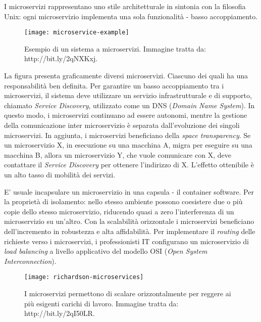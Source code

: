 I microservizi rappresentano uno stile architetturale in sintonia con la 
filosofia Unix: ogni microservizio implementa una sola funzionalità - basso 
accoppiamento.

\begin{figure}[htbp]
	\begin{center}
		\texttt{[image: microservice-example]}
		\caption{Esempio di un sistema a microservizi. Immagine tratta 
da: http://bit.ly/2qNXKxj.}
	\end{center}
\end{figure}

La figura presenta graficamente diversi microservizi. Ciascuno dei quali ha una 
responsabilità ben definita. Per garantire un basso accoppiamento tra i 
microservizi, il sistema deve utilizzare un servizio infrastrutturale e di 
supporto, chiamato \textit{Service Discovery}, utilizzato come un DNS 
(\textit{Domain Name System}). In questo modo, i microservizi continuano ad 
essere autonomi, mentre la gestione della comunicazione inter microservizio è 
separata dall'evoluzione dei singoli microservizi. 
In aggiunta, i microservizi beneficiano della \textit{space transparency}. Se 
un microservizio X, in esecuzione su una macchina A, migra per eseguire su una 
macchina B, allora un microservizio Y, che vuole comunicare con X, deve 
contattare il \textit{Service Discovery} per ottenere l'indirizzo di X. 
L'effetto ottenibile è un alto tasso di mobilità dei servizi.  

E' usuale incapsulare un microservizio in una capsula - il container software. 
Per la proprietà di isolamento: nello stesso ambiente possono coesistere due o 
più copie dello stesso microservizio, riducendo quasi a zero l'interferenza di 
un microservizio su un'altro. 
Con la scalabilità orizzontale i microservizi beneficiano dell'incremento in 
robustezza e alta affidabilità. Per implementare il \textit{routing} delle 
richieste verso i microservizi, i professionisti IT configurano un 
microservizio di \textit{load balancing} a livello applicativo del modello OSI 
(\textit{Open System Interconnection}).


\begin{figure}[htbp]
	\begin{center}
		\texttt{[image: richardson-microservices]}
		\caption{I microservizi permettono di scalare orizzontalmente 
per reggere ai più esigenti carichi di lavoro. Immagine tratta da: 
http://bit.ly/2qI50LR.}
	\end{center}
\end{figure}

